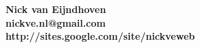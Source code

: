 \documentclass[a4paper,landscape,pdftex]{article}
\author{Nick van Eijndhoven}
\date{Utrecht, 2008}
\begin{document}
\begin{titlepage}
\begin{center}
\vspace*{-3.5cm}
{\LARGE \bf
 Nick van Eijndhoven\\[5mm]
 nickve.nl@gmail.com\\[2mm]
 http://sites.google.com/site/nickveweb
}
\end{center}
\end{titlepage}







\end{document}
